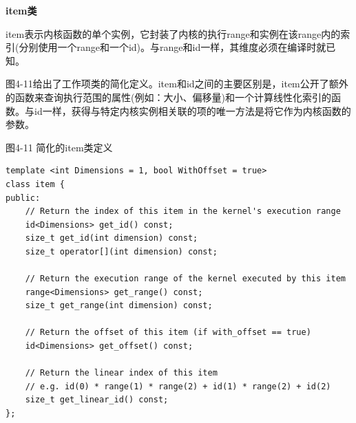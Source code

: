 \hspace*{\fill} \par %
\textbf{item类}

item表示内核函数的单个实例，它封装了内核的执行range和实例在该range内的索引(分别使用一个range和一个id)。与range和id一样，其维度必须在编译时就已知。\par

图4-11给出了工作项类的简化定义。item和id之间的主要区别是，item公开了额外的函数来查询执行范围的属性(例如：大小、偏移量)和一个计算线性化索引的函数。与id一样，获得与特定内核实例相关联的项的唯一方法是将它作为内核函数的参数。\par

\hspace*{\fill} \par %
图4-11 简化的item类定义
\begin{lstlisting}[caption={}]
template <int Dimensions = 1, bool WithOffset = true>
class item {
public:
	// Return the index of this item in the kernel's execution range
	id<Dimensions> get_id() const;
	size_t get_id(int dimension) const;
	size_t operator[](int dimension) const;
	
	// Return the execution range of the kernel executed by this item
	range<Dimensions> get_range() const;
	size_t get_range(int dimension) const;
	
	// Return the offset of this item (if with_offset == true)
	id<Dimensions> get_offset() const;
	
	// Return the linear index of this item
	// e.g. id(0) * range(1) * range(2) + id(1) * range(2) + id(2)
	size_t get_linear_id() const;
};
\end{lstlisting}










